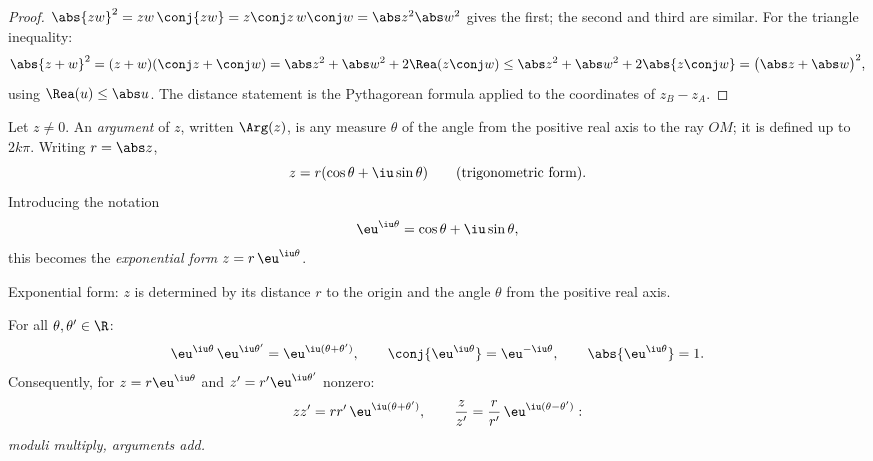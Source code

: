 \begin{proof}
$\abs{zw}^2 = zw\,\conj{zw} = z\conj z\, w \conj w = \abs z^2 \abs w^2$
gives the first; the second and third are similar. For the triangle
inequality:
\[
\abs{z+w}^2 = (z+w)(\conj z + \conj w)
= \abs z^2 + \abs w^2 + 2\Rea(z \conj w)
\leq \abs z^2 + \abs w^2 + 2\abs{z\conj w}
= \bigl(\abs z + \abs w\bigr)^2,
\]
using $\Rea(u) \leq \abs u$. The distance statement is the Pythagorean
formula applied to the coordinates of $z_B - z_A$.
\end{proof}

\begin{definition}\label{def:tle:complex:argument}
Let $z \neq 0$. An \emph{argument} of $z$, written
$\Arg(z)$, is any measure $\theta$ of the angle from the positive real axis
to the ray $OM$; it is defined up to $2k\pi$. Writing $r = \abs z$,
\[
z = r(\cos\theta + \iu\sin\theta)
\qquad\text{(trigonometric form)}.
\]
Introducing the notation
\[
\eu^{\iu\theta} = \cos\theta + \iu\sin\theta,
\]
this becomes the \emph{exponential form} $z = r\,\eu^{\iu\theta}$.
\end{definition}

\begin{omfigure}

{\small Exponential form: $z$ is determined by its distance $r$ to the
origin and the angle $\theta$ from the positive real axis.}
\end{omfigure}

\begin{theorem}\label{thm:tle:complex:expform}
For all $\theta, \theta' \in \R$:
\[
\eu^{\iu\theta}\,\eu^{\iu\theta'} = \eu^{\iu(\theta + \theta')},
\qquad
\conj{\eu^{\iu\theta}} = \eu^{-\iu\theta},
\qquad
\abs{\eu^{\iu\theta}} = 1 .
\]
Consequently, for $z = r\eu^{\iu\theta}$ and $z' = r'\eu^{\iu\theta'}$
nonzero:
\[
zz' = rr'\,\eu^{\iu(\theta+\theta')},
\qquad
\frac{z}{z'} = \frac{r}{r'}\,\eu^{\iu(\theta - \theta')} :
\]
\emph{moduli multiply, arguments add.}
\end{theorem}

